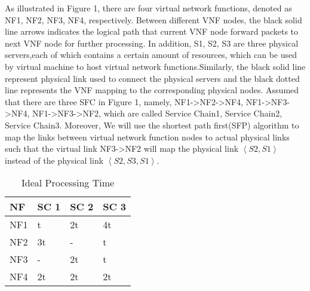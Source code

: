 \documentclass{ieeeaccess}
\begin{document}
As illustrated in Figure 1, there are four virtual network functions, denoted as NF1, NF2, NF3, NF4, respectively. Between different VNF nodes, the black solid line arrows indicates the logical path that current VNF node forward packets to next VNF node for further processing. In addition, S1, S2, S3 are three physical servers,each of which contains a certain amount of resources, which can be used  by virtual machine to host virtual network functions.Similarly, the black solid line represent  physical link used to connect the physical servers and the black dotted line represents the VNF mapping to the corresponding physical nodes. Assumed that there are three SFC in Figure 1, namely, NF1->NF2->NF4, NF1->NF3->NF4, NF1->NF3->NF2, which are called Service Chain1, Service Chain2, Service Chain3. Moreover, We will use the shortest path first(SFP) algorithm to map the links between virtual network function nodes to actual physical links such that the virtual link NF3->NF2 will map the physical link $\left \langle S2,S1 \right \rangle$ instead of the physical link $\left \langle S2,S3,S1 \right \rangle$.

\begin{table}
\Large
\caption{\centering Ideal Processing Time}
\begin{tabular}{p{2cm}|p{1.5cm}|p{1.5cm}|p{1.5cm}}
\hline
NF & SC 1 & SC 2 & SC 3 \\
 \hline
NF1 & t & 2t & 4t \\
\hline
NF2 & 3t & - & t \\
\hline
NF3 & - & 2t & t  \\
\hline
NF4 & 2t & 2t & 2t \\
\hline
\end{tabular}
\end{table}
\end{document}
